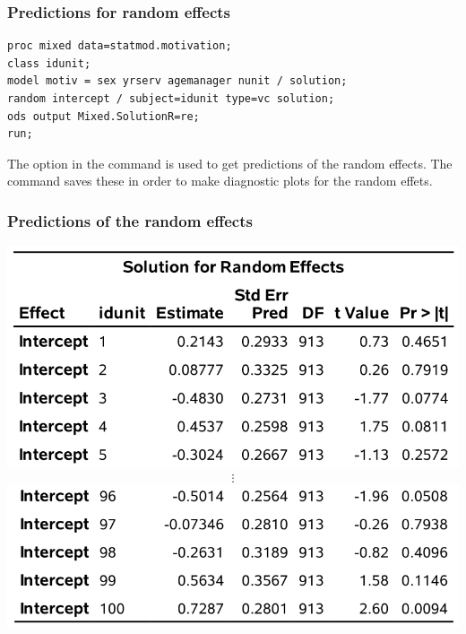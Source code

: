 \documentclass{beamer}
\begin{document}
\begin{frame}[fragile]
\frametitle{Predictions for random effects}
\begin{tcolorbox}[colback=white, colframe=hecblue, title=\SASlang{} code for the random intercept model]
\begin{small}
\begin{verbatim}
proc mixed data=statmod.motivation;
class idunit;
model motiv = sex yrserv agemanager nunit / solution;
random intercept / subject=idunit type=vc solution;
ods output Mixed.SolutionR=re;
run;
\end{verbatim}
\end{small}
\end{tcolorbox}
\begin{small} The option  in the command  is used to get predictions of the random effects. The command 
saves these in order to make diagnostic plots for the random effets.\end{small}
\end{frame}

\begin{frame}
\frametitle{Predictions of the random effects}
\begin{center}
\includegraphics[width = 0.7\linewidth]{img/c6/slides7-e19}
\begin{align*}
 \vdots
\end{align*}
\includegraphics[width = 0.7\linewidth]{img/c6/slides7-e20}
\end{center}
\end{frame}
\end{document}
